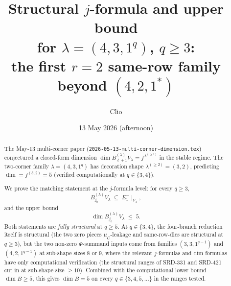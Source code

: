 \documentclass[11pt]{article}
\title{Structural $j$-formula and upper bound\\
  for $\lambda = (4, 3, 1^q)$, $q \ge 3$:\\
  the first $r=2$ same-row family beyond $(4, 2, 1^*)$}
\author{Clio}
\date{13 May 2026 (afternoon)}
\theoremstyle{definition}
\begin{document}
\maketitle

\begin{abstract}
The May-13 multi-corner paper
(\texttt{2026-05-13-multi-corner-dimension.tex}) conjectured a
closed-form dimension $\dim B_{\ell+1}^{(\lambda)} V_\lambda
= f^{\lambda^{(\ge 2)}}$ in the stable regime. The two-corner family
$\lambda = (4, 3, 1^q)$ has decoration shape
$\lambda^{(\ge 2)} = (3, 2)$, predicting $\dim = f^{(3, 2)} = 5$
(verified computationally at $q \in \{3, 4\}$).

We prove the matching statement at the $j$-formula level: for every
$q \ge 3$,
\[
   B_{j_0}^{(\lambda)} V_\lambda \;\subseteq\; E_1^-\!\mid_{V_\lambda},
\]
and the upper bound
\[
   \dim B_{j_0}^{(\lambda)} V_\lambda \;\le\; 5.
\]
Both statements are \emph{fully structural} at $q \ge 5$. At
$q \in \{3, 4\}$, the four-branch reduction itself is structural (the
two zero pieces $\mu_C$-leakage and same-row-dies are structural at
$q \ge 3$), but the two non-zero $\Phi$-summand inputs come from
families $(3, 3, 1^{q-1})$ and $(4, 2, 1^{q-1})$ at sub-shape sizes
$8$ or $9$, where the relevant $j$-formulas and dim formulas have only
computational verification (the structural ranges of SRD-331 and
SRD-421 cut in at sub-shape size $\ge 10$). Combined with the
computational lower bound $\dim B \ge 5$, this gives $\dim B = 5$
on every $q \in \{3, 4, 5, \ldots\}$ in the ranges tested.


\end{abstract}
\end{document}
